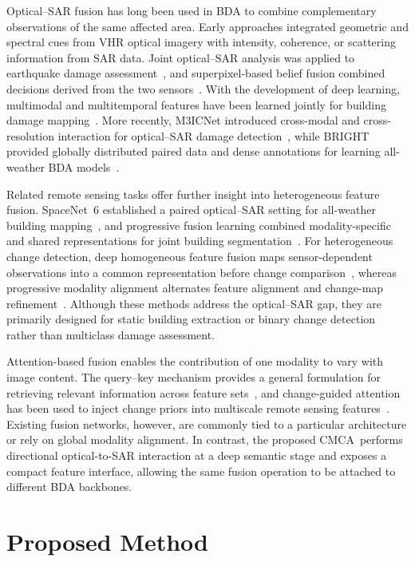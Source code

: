 \documentclass[journal]{IEEEtran}
\newcommand{\cmca}{CMCA}
\begin{document}
    Optical--SAR fusion has long been used in BDA to combine complementary observations of the same affected area. Early approaches integrated geometric and spectral cues from VHR optical imagery with intensity, coherence, or scattering information from SAR data. Joint optical--SAR analysis was applied to earthquake damage assessment~\cite{brunner2010earthquake}, and superpixel-based belief fusion combined decisions derived from the two sensors~\cite{jiang2020belief}. With the development of deep learning, multimodal and multitemporal features have been learned jointly for building damage mapping~\cite{adriano2021multimodal}. More recently, M3ICNet introduced cross-modal and cross-resolution interaction for optical--SAR damage detection~\cite{zhang2025m3icnet}, while BRIGHT provided globally distributed paired data and dense annotations for learning all-weather BDA models~\cite{chen2025bright}.
    
    Related remote sensing tasks offer further insight into heterogeneous feature fusion. SpaceNet~6 established a paired optical--SAR setting for all-weather building mapping~\cite{shermeyer2020spacenet6}, and progressive fusion learning combined modality-specific and shared representations for joint building segmentation~\cite{li2023progressive}. For heterogeneous change detection, deep homogeneous feature fusion maps sensor-dependent observations into a common representation before change comparison~\cite{jiang2020dhff}, whereas progressive modality alignment alternates feature alignment and change-map refinement~\cite{xing2023progressive}. Although these methods address the optical--SAR gap, they are primarily designed for static building extraction or binary change detection rather than multiclass damage assessment.
    
    Attention-based fusion enables the contribution of one modality to vary with image content. The query--key mechanism provides a general formulation for retrieving relevant information across feature sets~\cite{vaswani2017attention}, and change-guided attention has been used to inject change priors into multiscale remote sensing features~\cite{han2023cgnet}. Existing fusion networks, however, are commonly tied to a particular architecture or rely on global modality alignment. In contrast, the proposed \cmca\ performs directional optical-to-SAR interaction at a deep semantic stage and exposes a compact feature interface, allowing the same fusion operation to be attached to different BDA backbones.
    
    \section{Proposed Method}
    \label{sec:methodology}
    
\end{document}
